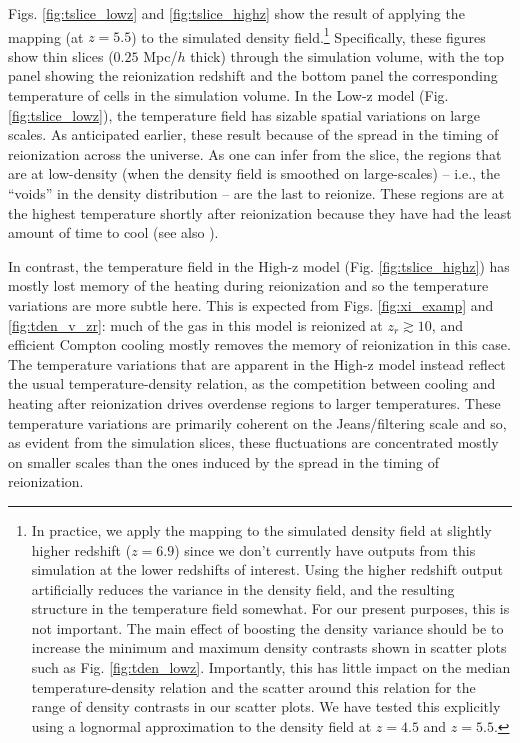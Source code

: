 Figs. \ref{fig:tslice_lowz} and \ref{fig:tslice_highz} show the result of applying the mapping (at $z=5.5$) to the simulated density field.\footnote{In practice, we apply the mapping to the simulated density field at slightly higher redshift ($z=6.9$) since we don't currently
have outputs from this simulation at the lower redshifts of interest. Using the higher redshift output artificially reduces the variance in the density field, and the
resulting structure in the temperature field somewhat. For our present purposes, this is not important. The main effect of boosting the density
variance should be to increase the minimum and maximum density contrasts shown in scatter plots such as Fig. \ref{fig:tden_lowz}. 
Importantly, this has little impact on the median temperature-density relation and the scatter around this relation for the range of
density contrasts in our scatter plots. We have tested this explicitly using a lognormal approximation to the density field at $z=4.5$ and
$z=5.5$.} Specifically, these figures show thin slices ($0.25$ Mpc/$h$ thick) through the simulation volume, with the top
panel showing the reionization redshift and the bottom panel the corresponding temperature of cells in
the simulation volume. In the Low-z model (Fig. \ref{fig:tslice_lowz}), the temperature field
has sizable spatial variations on large scales. As anticipated earlier, these result because of the spread in the timing of reionization
across the universe. As one can infer from the slice, the regions that are at low-density (when the density field
is smoothed on large-scales) -- i.e., the ``voids'' in the density distribution -- are the last to reionize. These
regions are at the highest temperature shortly after reionization because they have
had the least amount of time to cool (see also \citealt{Trac:2008yz,Furlanetto:2009kr}).

In contrast, the temperature field in the High-z model (Fig. \ref{fig:tslice_highz}) has mostly lost memory of
the heating during reionization and so the temperature variations are more subtle here. This is expected from Figs.
\ref{fig:xi_examp} and \ref{fig:tden_v_zr}: much of the gas in this model is reionized at $z_r \gtrsim 10$,
and efficient Compton cooling mostly removes the memory of reionization in this case.
The temperature variations that are apparent in the High-z model instead reflect the usual
temperature-density relation, as the competition between cooling and heating after reionization drives overdense
regions to larger temperatures. These temperature variations 
are primarily coherent on the Jeans/filtering scale and so, as evident from the simulation slices, these fluctuations are concentrated mostly
on smaller scales than the ones induced by the spread in the timing of reionization. 

